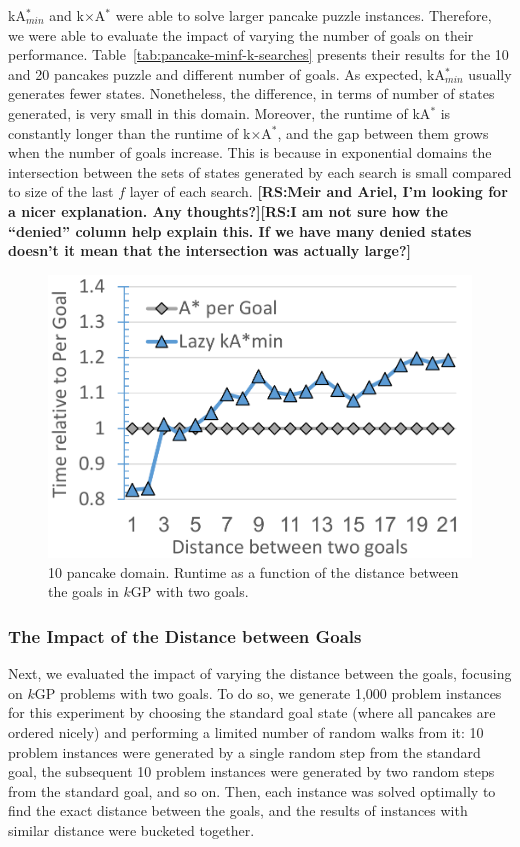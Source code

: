 \documentclass{aicom2e}
\newcommand{\kgs}{$k$GP}
\newcommand{\kastar}{kA$^*$}
\newcommand{\kastarmin}{kA$^*_{min}$}
\newcommand{\kxastar}{k$\times$A$^*$}
\newcommand{\roni}[1]{\textbf{[RS:#1]}}
\begin{document}
\kastarmin{} and \kxastar{} were able to solve larger pancake puzzle instances. Therefore, we were able to evaluate
 the impact of varying the number of goals on their performance. Table~\ref{tab:pancake-minf-k-searches} presents their results for the 10 and 20 pancakes puzzle and different number of goals. As expected, \kastarmin{} usually generates fewer states. Nonetheless, the difference, in terms of number of states generated, is very small in this domain.  Moreover, the runtime of \kastar{} is constantly longer than the runtime of \kxastar{}, and the gap between them grows when the number of goals increase. This is because in exponential domains the intersection between the sets of states generated by each search is small compared to size of the last $f$ layer of each search. \roni{Meir and Ariel, I'm looking for a nicer explanation. Any thoughts?}\roni{I am not sure how the ``denied'' column help explain this. If we have many denied states doesn't it mean that the intersection was actually large?}


\begin{figure}
    \includegraphics[width=\columnwidth]{pancake-goal-distance_cropped.pdf}
    \caption{10 pancake domain. Runtime as a function of the distance between the goals in \kgs{} with two goals.}
    \label{fig:2-goal-pancake}
\end{figure}

\subsubsection{The Impact of the Distance between Goals}
Next, we evaluated the impact of varying the distance between the goals, focusing on \kgs{} problems with two goals. 
To do so, we generate 1,000 problem instances for this experiment by choosing the standard goal state (where all pancakes are ordered nicely) and performing a limited number of random walks from it: 10 problem instances were generated by a single random step from the standard goal, 
the subsequent 10 problem instances were generated by two random steps from the standard goal, and so on. 
Then, each instance was solved optimally to find the exact distance between the goals, and the results of instances with similar
distance were bucketed together. 
\end{document}

